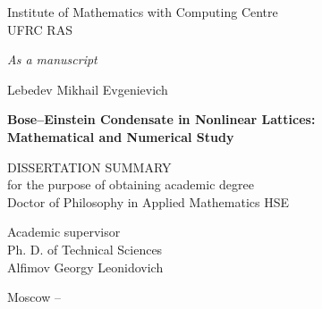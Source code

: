 \documentclass[candidate, href, colorlinks]{disser}
\begin{document}
\begin{titlepage}
\thispagestyle{empty}
\enlargethispage{1cm}
\vspace*{-2cm}

\begin{center}
	Institute of Mathematics with Computing Centre \\ UFRC RAS
\end{center}

\vskip1cm
	
\begin{flushright}
	\emph{As a manuscript}
\end{flushright}
	
\vskip3cm

\begin{center}
	{\large Lebedev Mikhail Evgenievich}
	\vskip1cm
	{\Large\bfseries Bose--Einstein Condensate in Nonlinear Lattices: \\ Mathematical and Numerical Study\par}
	\vskip1.5cm
	{DISSERTATION SUMMARY \\ for the purpose of obtaining academic degree \\ Doctor of Philosophy in Applied Mathematics HSE}
\end{center}

\vskip2cm

\hspace{8cm}\begin{minipage}{0.4\linewidth}
	Academic supervisor \\
	Ph. D. of Technical Sciences \\
	Alfimov Georgy Leonidovich
\end{minipage}

\vfill

\begin{center}
	{Moscow -- \the\year}
\end{center}

\normalfont\clearpage
\end{titlepage}
\end{document}
